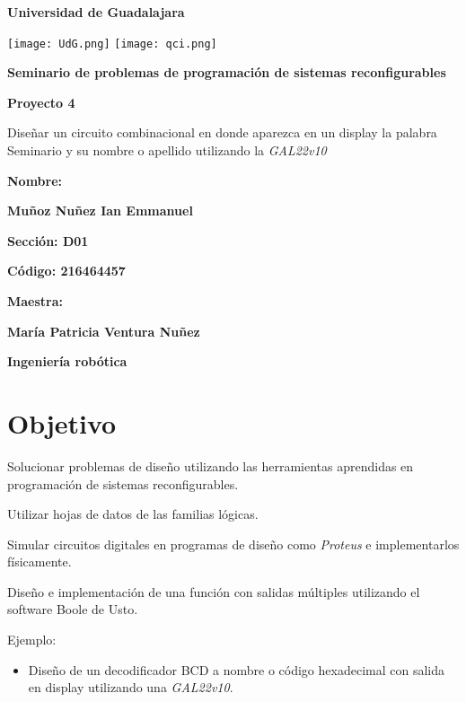 \documentclass[12pt, oneside, openany]{article}
\begin{document}
\begin{titlepage}
    \centering
    {\bfseries\LARGE Universidad de Guadalajara \par}
    \vfill
    {
        \texttt{[image: UdG.png]}
        \texttt{[image: qci.png]}
        \par
    }
    \vfill
    {\bfseries\LARGE Seminario de problemas de programación de sistemas reconfigurables \par}
    \vfill
    {\bfseries\LARGE Proyecto 4 \par}
    \vfill
    {\LARGE Diseñar un circuito combinacional en donde aparezca en un display la palabra Seminario y su nombre o apellido utilizando la \emph{GAL22v10} \par}
    \vfill
    {\bfseries\LARGE Nombre: \par}
    \vfill
    {\bfseries\LARGE Muñoz Nuñez Ian Emmanuel \par}
    \vfill
    {\bfseries\LARGE Sección: D01 \par}
    \vfill
    {\bfseries\LARGE Código: 216464457 \par}
    \vfill
    {\bfseries\LARGE Maestra: \par}
    \vfill
    {\bfseries\LARGE María Patricia Ventura Nuñez \par}
    \vfill
    {\bfseries\LARGE Ingeniería robótica \par}
\end{titlepage}

\newpage
\section{Objetivo}
{\sffamily\large
    \hspace{0.5cm} Solucionar problemas de diseño utilizando las herramientas aprendidas en programación de sistemas reconfigurables.
    
    \hspace{0.5cm} Utilizar hojas de datos de las familias lógicas.
    
    \hspace{0.5cm} Simular circuitos digitales en programas de diseño como \emph{Proteus\texttrademark} e implementarlos físicamente.
    
    \hspace{0.5cm} Diseño e implementación de una función con salidas múltiples utilizando el software Boole de Usto.
    
    \hspace{0.5cm} Ejemplo:
    \renewcommand{\labelitemi}{$\bullet$}
    \begin{itemize}
        \item Diseño de un decodificador BCD a nombre o código hexadecimal con salida en display utilizando una \emph{GAL22v10}.
    \end{itemize}
    
}
\end{document}
